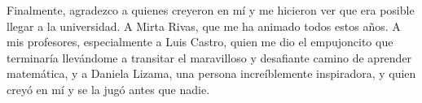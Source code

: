 \documentclass[upright, contnum]{umemoria}
\begin{document}
\begin{thanks}
Finalmente, agradezco a quienes creyeron en mí y me hicieron ver que era posible llegar a la universidad. A Mirta Rivas, que me ha animado todos estos años. A mis profesores, especialmente a Luis Castro, quien me dio el empujoncito que terminaría llevándome a transitar el maravilloso y desafiante camino de aprender matemática, y a Daniela Lizama, una persona increíblemente inspiradora, y quien creyó en mí y se la jugó antes que nadie. 


\end{thanks}

\tableofcontents
\listoftables
\listoffigures

\mainmatter








% 
% 


\cleardoublepage
{}
{}

\let\oldaddcontentsline\addcontentsline%
\renewcommand{\addcontentsline}[3]{}%

\let\addcontentsline\oldaddcontentsline%

\appendix
\setcounter{secnumdepth}{-1} %

\end{document}
